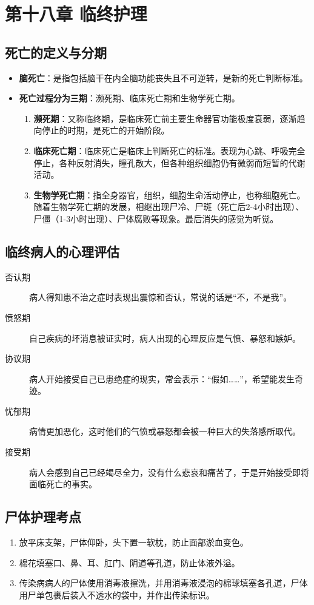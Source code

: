 \documentclass[11pt, a4paper]{ctexart}
\begin{document}
\section{第十八章 临终护理}
\subsection{死亡的定义与分期}
\begin{itemize}
	\item \textbf{脑死亡}：是指包括脑干在内全脑功能丧失且不可逆转，是新的死亡判断标准。
	\item \textbf{死亡过程分为三期}：濒死期、临床死亡期和生物学死亡期。
	      \begin{enumerate}
		      \item \textbf{濒死期}：又称临终期，是临床死亡前主要生命器官功能极度衰弱，逐渐趋向停止的时期，是死亡的开始阶段。
		      \item \textbf{临床死亡期}：临床死亡是临床上判断死亡的标准。表现为心跳、呼吸完全停止，各种反射消失，瞳孔散大，但各种组织细胞仍有微弱而短暂的代谢活动。
		      \item \textbf{生物学死亡期}：指全身器官，组织，细胞生命活动停止，也称细胞死亡。随着生物学死亡期的发展，相继出现尸冷、尸斑（死亡后2-4小时出现）、尸僵（1-3小时出现）、尸体腐败等现象。最后消失的感觉为听觉。
	      \end{enumerate}
\end{itemize}

\subsection{临终病人的心理评估}
\begin{description}
	\item[否认期] 病人得知患不治之症时表现出震惊和否认，常说的话是“不，不是我”。
	\item[愤怒期] 自己疾病的坏消息被证实时，病人出现的心理反应是气愤、暴怒和嫉妒。
	\item[协议期] 病人开始接受自己已患绝症的现实，常会表示：“假如……”，希望能发生奇迹。
	\item[忧郁期] 病情更加恶化，这时他们的气愤或暴怒都会被一种巨大的失落感所取代。
	\item[接受期] 病人会感到自己已经竭尽全力，没有什么悲哀和痛苦了，于是开始接受即将面临死亡的事实。
\end{description}

\subsection{尸体护理考点}
\begin{enumerate}
	\item 放平床支架，尸体仰卧，头下置一软枕，防止面部淤血变色。
	\item 棉花填塞口、鼻、耳、肛门、阴道等孔道，防止体液外溢。
	\item 传染病病人的尸体使用消毒液擦洗，并用消毒液浸泡的棉球填塞各孔道，尸体用尸单包裹后装入不透水的袋中，并作出传染标识。
\end{enumerate}
\end{document}
